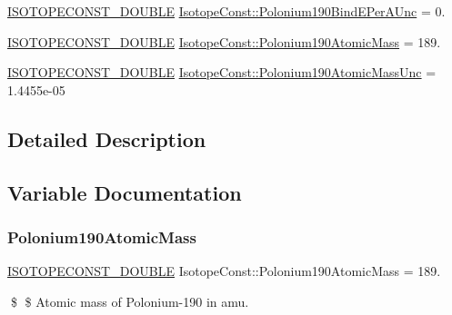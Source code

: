 \begin{DoxyCompactItemize}
\mbox{\hyperlink{group___isotope_const-_macros_ga8f45a7272ce02c0b4c65c44636ed719a}{I\+S\+O\+T\+O\+P\+E\+C\+O\+N\+S\+T\+\_\+\+D\+O\+U\+B\+LE}} \mbox{\hyperlink{group___isotope_const-_polonium-_po190_gaddc4eb1271788833b5ae845c4eb16b33}{Isotope\+Const\+::\+Polonium190\+Bind\+E\+Per\+A\+Unc}} = 0.
\item 
\mbox{\hyperlink{group___isotope_const-_macros_ga8f45a7272ce02c0b4c65c44636ed719a}{I\+S\+O\+T\+O\+P\+E\+C\+O\+N\+S\+T\+\_\+\+D\+O\+U\+B\+LE}} \mbox{\hyperlink{group___isotope_const-_polonium-_po190_gae06c6c2daf208fb09df77a201c7c09e9}{Isotope\+Const\+::\+Polonium190\+Atomic\+Mass}} = 189.
\item 
\mbox{\hyperlink{group___isotope_const-_macros_ga8f45a7272ce02c0b4c65c44636ed719a}{I\+S\+O\+T\+O\+P\+E\+C\+O\+N\+S\+T\+\_\+\+D\+O\+U\+B\+LE}} \mbox{\hyperlink{group___isotope_const-_polonium-_po190_ga5b7b1fe6bbc6cbd5d25e7277065a64bf}{Isotope\+Const\+::\+Polonium190\+Atomic\+Mass\+Unc}} = 1.\+4455e-\/05
\end{DoxyCompactItemize}


\subsection{Detailed Description}


\subsection{Variable Documentation}
\mbox{\label{group___isotope_const-_polonium-_po190_gae06c6c2daf208fb09df77a201c7c09e9}} 
\subsubsection{\texorpdfstring{Polonium190\+Atomic\+Mass}{Polonium190AtomicMass}}
{\footnotesize\ttfamily \mbox{\hyperlink{group___isotope_const-_macros_ga8f45a7272ce02c0b4c65c44636ed719a}{I\+S\+O\+T\+O\+P\+E\+C\+O\+N\+S\+T\+\_\+\+D\+O\+U\+B\+LE}} Isotope\+Const\+::\+Polonium190\+Atomic\+Mass = 189.}

\$ \$ Atomic mass of Polonium-\/190 in amu. \mbox{\label{group___isotope_const-_polonium-_po190_ga5b7b1fe6bbc6cbd5d25e7277065a64bf}} 

